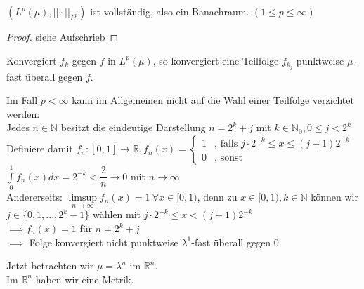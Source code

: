 
  \begin{theorem}
    $(L^p(\mu), ||\cdot||_{L^p})$ ist vollständig, also ein Banachraum. $(1 \leq p \leq \infty)$
  \end{theorem}
  \begin{proof}
    siehe Aufschrieb
  \end{proof}

  \begin{lemma}
    Konvergiert $f_k$ gegen $f$ in $L^p(\mu)$, so konvergiert eine Teilfolge $f_{k_j}$ punktweise $\mu$-fast überall gegen $f$.
  \end{lemma}  
  
  \begin{example}
    Im Fall $p < \infty$ kann im Allgemeinen nicht auf die Wahl einer Teilfolge verzichtet werden:\\
    Jedes $n \in \mathbb{N}$ besitzt die eindeutige Darstellung $n=2^k+j$ mit $k \in \mathbb{N}_0, 0 \leq j < 2^k$\\
    Definiere damit $f_n:[0,1] \to \mathbb{R}, f_n(x) = \begin{cases}
      1 & \text{, falls } j \cdot 2^{-k} \leq x \leq (j+1) 2^{-k}\\
      0 & \text{, sonst}
    \end{cases}$\\
    $\int\limits_0^1 f_n(x) dx = 2^{-k} < \dfrac{2}{n} \to 0$ mit $n \to \infty$\\
    Andererseits: $\limsup\limits_{n \to \infty} f_n(x) = 1 \ \forall x \in [0,1)$, denn zu $x \in [0,1), k \in \mathbb{N}$ können wir\\
    $j \in \{0,1,...,2^k-1\}$ wählen mit $j \cdot 2^{-k} \leq x < (j+1) 2^{-k}$\\
    $\implies f_n(x) = 1$ für $n = 2^k+j$\\
    $\implies$ Folge konvergiert nicht punktweise $\lambda^1$-fast überall gegen $0$.
  \end{example}

  \begin{remark}
    Jetzt betrachten wir $\mu=\lambda^n$ im $\mathbb{R}^n$.\\
    Im $\mathbb{R}^n$ haben wir eine Metrik.
  \end{remark}

